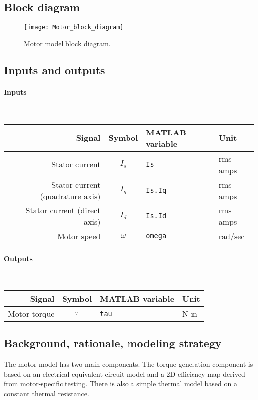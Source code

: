 \documentclass[../SimBALink.tex]{subfiles}
\begin{document}
\subsection{Block diagram}
	\begin{figure}[h]
			\centering
			\texttt{[image: Motor\_block\_diagram]}
			\caption{Motor model block diagram.}
	\end{figure}
	\FloatBarrier

\subsection{Inputs and outputs}
	\paragraph{Inputs} -
	\\ 
	\begin{tabular}{ r | c | l | l }
		Signal						&	Symbol				&	MATLAB variable	&	Unit						\\\hline	
		Stator current					&	$I_s$				&	\texttt{Is}			&	rms amps					\\
		Stator current (quadrature axis)	&	$I_q$				&	\texttt{Is.Iq}		&	rms amps			\\
		Stator current (direct axis)		&	$I_d$				&	\texttt{Is.Id}		&	rms amps			\\
		Motor speed					&	$\omega$			&	\texttt{omega}		&	rad/sec
	\end{tabular}
	
	\paragraph{Outputs} -
	\\
		\begin{tabular}{ r | c | l | l }
			Signal						&	Symbol				&	MATLAB variable	&	Unit						\\\hline	
			Motor torque					&	$\tau$				&	\texttt{tau}		&		N m				\\
		\end{tabular}
	
\subsection{Background, rationale, modeling strategy}
	The motor model has two main components. The torque-generation component is based on an electrical equivalent-circuit model and a 2D efficiency map derived from motor-specific testing. There is also a simple thermal model based on a constant thermal resistance.
	
\end{document}
